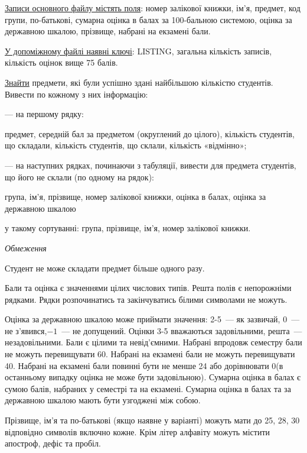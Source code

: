 \documentclass[11pt, ukrainian]{article}
\begin{document}
\underline{Записи основного файлу містять поля}: номер залікової книжки, ім’я, предмет, код групи, по-батько\-ві, сумарна оцінка в балах за 100-бальною системою, оцінка за державною шкалою, прізвище, набрані на екзамені бали.

\underline{У допоміжному файлі наявні ключі}: LISTING, загальна кількість записів, кількість оцінок вище 75 балів.

\underline{Знайти} предмети, які були успішно здані найбільшою кількістю студентів. Вивести по кожному з них інформацію:\par
{\noindent}--- на першому рядку:\par
предмет, середній бал за предметом (округлений до цілого), кількість студентів, що складали, кількість студентів, що склали, кількість «відмінно»;

{\noindent}--- на наступних рядках, починаючи з табуляції, вивести для предмета студентів, що його не склали (по одному на рядок):\par
група, ім’я, прізвище, номер залікової книжки, оцінка в балах, оцінка за державною шкалою

{\noindent}у такому сортуванні: група, прізвище, ім’я, номер залікової книжки.


\bigskip\textit{Обмеження}

Студент не може складати предмет більше одного разу.

Бали та оцінка є значеннями цілих числових типів. Решта полів є непорожніми рядками.
Рядки розпочинатись та закінчуватись білими символами не можуть.

Оцінка за державною шкалою може приймати значення: 2-5~--- як зазвичай, 0~--- не з’явився,$-1$~--- не допущений. 
Оцінки 3-5 вважаються задовільними, решта~--- незадовільними. 
Бали є цілими та невід’ємними.
Набрані впродовж семестру бали не можуть перевищувати 60. 
Набрані на екзамені бали не можуть перевищувати 40. 
Набрані на екзамені бали повинні бути не менше 24 або дорівнювати 0(в останньому випадку оцінка не може бути задовільною). 
Сумарна оцінка в балах є сумою балів, набраних у семестрі та на екзамені.
Сумарна оцінка в балах та за державною шкалою мають бути узгоджені між собою.

Прізвище, ім’я та по-батькові (якщо наявне у варіанті) можуть мати до 25, 28, 30 відповідно символів включно кожне. 
Крім літер алфавіту можуть містити апостроф, дефіс та пробіл.
\end{document}
